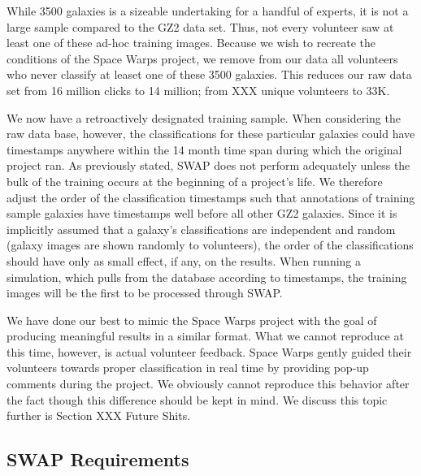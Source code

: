 \documentclass[twocolumn]{aastex6}
\begin{document}
While 3500 galaxies is a sizeable undertaking for a handful of experts, it is not a
large sample compared to the GZ2 data set. Thus, not every volunteer saw at least 
one of these ad-hoc training images. Because we wish to recreate the conditions 
of the Space Warps project, we remove from our data all volunteers who never 
classify at leaset one of these 3500 galaxies. This reduces our raw data set from
16 million clicks to 14 million; from XXX unique volunteers to 33K. 

We now have a retroactively designated training sample. When considering the 
raw data base, however, the classifications for these particular galaxies could 
have timestamps anywhere within the 14 month time span during which the original project ran.
As previously stated, SWAP does not perform adequately unless the bulk of the
training occurs at the beginning of a project's life. We therefore adjust the order
of the classification timestamps such that annotations of training sample galaxies
have timestamps well before all other GZ2 galaxies. Since it is implicitly assumed
that a galaxy's classifications are independent and random (galaxy images are 
shown randomly to volunteers), the order of the classifications should have only
as small effect, if any, on the results.  When running a simulation, which
pulls from the database according to timestamps, the training images will be the 
first to be processed through SWAP. 

We have done our best to mimic the Space Warps project with the goal of producing 
meaningful results in a similar format. What we cannot reproduce at this time, however,
is actual volunteer feedback. Space Warps gently guided their volunteers towards 
proper classification in real time by providing pop-up comments during the project. 
We obviously cannot reproduce this behavior after the fact though this difference
should be kept in mind. We discuss this topic further is Section XXX Future Shits. 

\subsection{SWAP Requirements}
\end{document}
